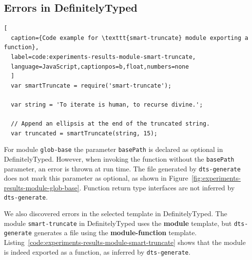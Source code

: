 \documentclass[sigplan,screen]{acmart}
\newcommand{\figref}[1]{Figure~\ref{#1}}
\newcommand{\coderef}[1]{Listing~\ref{#1}}
\begin{document}
\subsection{Errors in DefinitelyTyped}
\label{sec:errors-definitely-typed}

\begin{lstlisting}[
  caption={Code example for \texttt{smart-truncate} module exporting a function},
  label=code:experiments-results-module-smart-truncate,
  language=JavaScript,captionpos=b,float,numbers=none
  ]
  var smartTruncate = require('smart-truncate');
  
  var string = 'To iterate is human, to recurse divine.';
  
  // Append an ellipsis at the end of the truncated string.
  var truncated = smartTruncate(string, 15);
\end{lstlisting}

For module \texttt{glob-base} the parameter
\texttt{basePath} is declared as optional in DefinitelyTyped. However, when invoking the
function without the \texttt{basePath} parameter, an error is thrown at run time. The file generated by
\texttt{dts-generate} does not mark this parameter as optional, as shown in
\figref{fig:experiments-results-module-glob-base}. Function return type interfaces are
not inferred by \texttt{dts-generate}.

We also
discovered errors in the selected template in DefinitelyTyped. The module
\texttt{smart-truncate} in DefinitelyTyped uses the \textbf{module} template, but
\texttt{dts-generate} generates a file using the \textbf{module-function}
template. \coderef{code:experiments-results-module-smart-truncate} shows that the module is indeed
exported as a function, as inferred by \texttt{dts-generate}.
\end{document}
